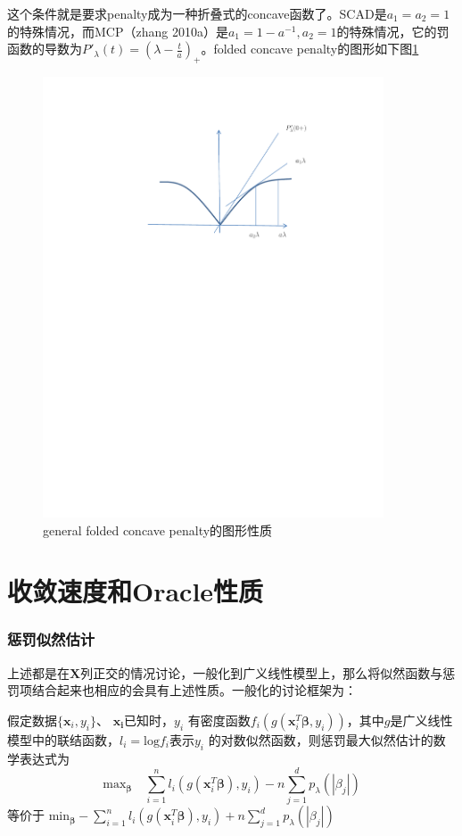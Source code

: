 ﻿\documentclass[hyperref,12pt]{ctexart}
\begin{document}
这个条件就是要求penalty成为一种折叠式的concave函数了。SCAD是$a_1 = a_2 = 1$的特殊情况，而MCP（zhang 2010a）是$a_1 = 1 - a^{-1}, a_2 = 1$的特殊情况，它的罚函数的导数为$P'_{\lambda}(t) = (\lambda - \frac{t}{a})_{+}$。folded concave penalty的图形如下图\ref{scad1}

\begin{figure}[ht]
\centering
\includegraphics[width = 0.9\textwidth]{scad1.pdf}
\caption{general folded concave penalty的图形性质}\label{scad1}
\end{figure}



\section{收敛速度和Oracle性质}
\subsubsection{惩罚似然估计}
上述都是在$\mathbf{X}$列正交的情况讨论，一般化到广义线性模型上，那么将似然函数与惩罚项结合起来也相应的会具有上述性质。一般化的讨论框架为：

假定数据$\{\mathbf{x}_i, y_i\}$、 $\mathbf{x_i}$已知时，$y_i$ 有密度函数$f_i(g(\mathbf{x}_i^T\boldsymbol{\beta}, y_i))$，其中$g$是广义线性模型中的联结函数，$l_i=\text{log}f_i$表示$y_i$ 的对数似然函数，则惩罚最大似然估计的数学表达式为
\[
\text{max}_{\boldsymbol{\beta}}\quad \sum^n_{i = 1}l_i(g(\mathbf{x}_i^T\boldsymbol{\beta}), y_i) - n\sum_{j=1}^d p_{\lambda}(|\beta_j|)
\]
等价于
$\text{min}_{\boldsymbol{\beta}} -\sum^n_{i = 1}l_i(g(\mathbf{x}_i^T\boldsymbol{\beta}), y_i) + n\sum_{j=1}^d p_{\lambda}(|\beta_j|)$
\end{document}

